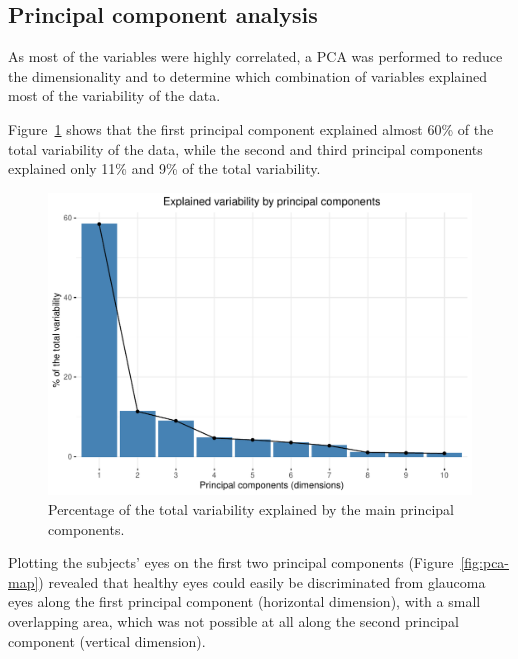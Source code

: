 \documentclass[jcm,article,submit,moreauthors,pdftex]{Definitions/mdpi}
\begin{document}
\subsection{Principal component analysis}

As most of the variables were highly correlated, a PCA was performed to reduce the dimensionality and to determine which combination of variables explained most of the variability of the data. 

Figure~\ref{fig:variability-explained-pca} shows that the first principal component explained almost 60\% of the total variability of the data, while the second and third principal components explained only 11\% and 9\% of the total variability.

\begin{figure}[ht]
\centering
\includegraphics[width=0.5\linewidth]{img/explained-variability-principal-components.pdf}
\caption{Percentage of the total variability explained by the main principal components.}
\label{fig:variability-explained-pca}
\end{figure}

Plotting the subjects’ eyes on the first two principal components (Figure~\ref{fig:pca-map}) revealed that healthy eyes could easily be discriminated from glaucoma eyes along the first principal component (horizontal dimension), with a small overlapping area, which was not possible at all along the second principal component (vertical dimension).
\end{document}
